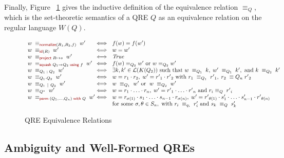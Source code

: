 \documentclass[acmsmall,review,anonymous]{acmart}
\newcommand{\kw}[1]{\textcolor{dkred}{\ensuremath{\mathsf{#1}}}}
\newcommand{\project}[2]{\ensuremath{\kw{project} \; #1 \mapsto #2}}
\newcommand{\squash}[3]{\ensuremath{\kw{squash} \; #1 \rightarrow #2\; \kw{using} \; #3}}
\newcommand{\perm}[2]{\ensuremath{\kw{perm}\; (#1)\; \kw{with}\; #2}}
\newcommand{\normalize}[3]{\ensuremath{\kw{normalize}(#1, #2, #3)}}
\newcommand{\eqrel}[1]{\ensuremath{\equiv_{#1}}}
\newcommand{\sep}{\ensuremath{\ | \ }}
\newcommand{\id}{\ensuremath{\kw{id}}}
\begin{document}
Finally, Figure ~\ref{fig:relations} gives the inductive definition of the
equivalence relation $\eqrel{Q}$, which is the set-theoretic semantics
of a QRE $Q$ as an equivalence relation on the regular language $W(Q)$.

\begin{figure}[t]
\centering
\[
\begin{array}{l@{}l@{\ \ }l}
w \; \equiv_{\normalize{R_1}{R_2}{f}} \; w' &\iff&
f(w)=f(w') \\
w \; \equiv_{\id(R)} \; w' &\iff& w = w' \\
w \; \equiv_{\project{R}{s}} \; w' &\iff& \mathit{True} \\ %
w \; \equiv_{\squash{Q_1}{Q_2}{f}} \; w' &\iff& f(w) \equiv_{Q_2} w'
\text{ or } w \equiv_{Q_2} w' \\
w \; \equiv_{Q_1 \; ; \; Q_2} \; w' &\iff& \exists k, k' \in
\mathcal{L}(K(Q_2)) \text{ such that } w \; \equiv_{Q_1} \; k, \; w' \;
\equiv_{Q_1} \; k', \text{ and } k \; \equiv_{Q_2} \; k'\\
w \; \equiv_{Q_1 \cdot Q_2} \; w'  &\iff& w = r_1
\cdot r_2, \; w' = {r'}_1 \cdot {r'}_2 \text{ with } r_1 \; \equiv_{Q_1}
\; {r'}_1, \; r_2 \; \equiv{Q_n} \; {r'}_2\\
w \; \equiv_{Q_1 \sep Q_2} \; w' &\iff& w \; \equiv_{Q_1} \; w'
\text{ or } \; w \; \equiv_{Q_2} \; w'\\
w \; \equiv_{Q^*} \; w' &\iff& w = r_1 \cdot \ldots \cdot r_n, \; w'
= {r'}_1 \cdot \ldots \cdot {r'}_n \text{ and } r_i \equiv_{Q} \; {r'}_i
\\
w \; \equiv_{\perm{Q_1, \ldots, Q_n}{Q}} \; w' &\iff& w = r_{\sigma(1)}
\cdot s_1 \cdot \ldots \cdot s_{n-1} \cdot r_{\sigma(n)}, \;
w' = {r'}_{\theta(1)} \cdot s'_1 \cdot \ldots \cdot s'_{n-1}
\cdot {r'}_{\theta(n)} \\
& & \text{for some } \sigma, \theta \in S_n, \text{ with } r_i \;
\equiv_{q_i} \; r'_i \text{ and } s_k \; \equiv_{Q} \; s'_{k}
\end{array}
\]
\caption{QRE Equivalence Relations}
\label{fig:relations}
\end{figure}
\subsection{Ambiguity and Well-Formed QREs}
\label{subsec:well-formed-qres}
\end{document}
